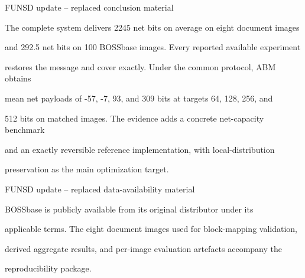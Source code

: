 \begin{RevisionDeletion}
FUNSD update -- replaced conclusion material\par
The complete system delivers 2245 net bits on average on eight document images\par
and 292.5 net bits on 100 BOSSbase images. Every reported available experiment\par
restores the message and cover exactly. Under the common protocol, ABM obtains\par
mean net payloads of -57, -7, 93, and 309 bits at targets 64, 128, 256, and\par
512 bits on matched images. The evidence adds a concrete net-capacity benchmark\par
and an exactly reversible reference implementation, with local-distribution\par
preservation as the main optimization target.\par
\end{RevisionDeletion}

\begin{RevisionDeletion}
FUNSD update -- replaced data-availability material\par
BOSSbase is publicly available from its original distributor under its\par
applicable terms. The eight document images used for block-mapping validation,\par
derived aggregate results, and per-image evaluation artefacts accompany the\par
reproducibility package.\par
\end{RevisionDeletion}
\makeatother





